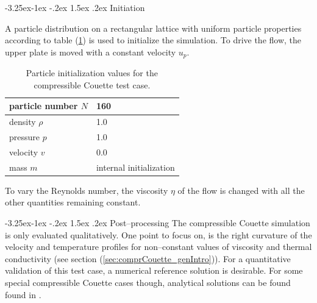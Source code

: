 \documentclass[11pt,a4paper,twoside]{report}
\makeatletter
\renewcommand\paragraph{\@startsection{paragraph}{4}{\z@}%
  {-3.25ex\@plus -1ex \@minus -.2ex}%
  {1.5ex \@plus .2ex}%
  {\normalfont\normalsize\bfseries}}
\makeatother
\begin{document}
\paragraph {Initiation}

A particle distribution on a rectangular lattice with uniform particle properties according to table (\ref{tab:InitPartValues_comprCouette}) is used to initialize the simulation.
To drive the flow, the upper plate is moved with a constant velocity $u_p$.%

\begin{table}[h] %
\label{tab:InitPartValues_comprCouette}
\centering

\begin{tabular}[c]{|l|p{5cm}|} %
\hline
\hline
particle number $N$ &  160\\
\hline
density $\rho$ &  1.0\\
\hline
pressure $p$ &  1.0 \\
\hline
velocity $v$ & 0.0\\
\hline
mass $m$ & internal initialization\\
\hline
\hline
\end{tabular}
\caption[]{Particle initialization values for the compressible Couette test case.}

\end{table}

To vary the Reynolds number, the viscosity $\eta$ of the flow is changed with all the other quantities remaining constant. 

\paragraph {Post--processing}
The compressible Couette simulation is only evaluated qualitatively. One point to focus on, is the right curvature of the velocity and temperature profiles for non--constant values of viscosity and thermal conductivity (see section (\ref{sec:comprCouette_genIntro})). For a quantitative validation of this test case, a numerical reference solution is desirable. For some special compressible Couette cases though, analytical solutions can be found found in \cite{Rogers1992}. 
\end{document}
